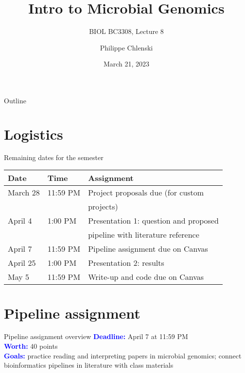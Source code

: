 \documentclass{beamer}
\title{Intro to Microbial Genomics}
\subtitle{BIOL BC3308, Lecture 8}
\author{Philippe Chlenski}
\date{March 21, 2023}
\newcommand{\blu}[1]{\textcolor{blue}{\textbf{#1}}}
\begin{document}
\begin{frame}[plain]
\titlepage
\end{frame}

\begin{frame}{Outline}
\tableofcontents
\end{frame}

\section{Logistics}

\begin{frame}{Remaining dates for the semester}
    \begin{table}[]
        \centering
        \begin{tabular}{l|l|l}
            \textbf{Date}        &  \textbf{Time}     & \textbf{Assignment}\\
            \hline
            March 28    &  11:59 PM & Project proposals due (for custom \\
                        &           & projects)\\
            April 4     &  1:00 PM  & Presentation 1: question and proposed\\
                        &           & pipeline with literature reference\\
            April 7     &  11:59 PM & Pipeline assignment due on Canvas\\
            April 25    &  1:00 PM  & Presentation 2: results\\
            May 5       &  11:59 PM & Write-up and code due on Canvas
        \end{tabular}
        \label{tab:dates}
    \end{table}
\end{frame}

\section{Pipeline assignment}

\begin{frame}{Pipeline assignment overview}
    \blu{Deadline:} April 7 at 11:59 PM\\
    \bigskip
    \blu{Worth:} 40 points\\
    \bigskip
    \blu{Goals:} practice reading and interpreting papers in microbial genomics; connect bioinformatics pipelines in literature with class materials
\end{frame}
\end{document}
